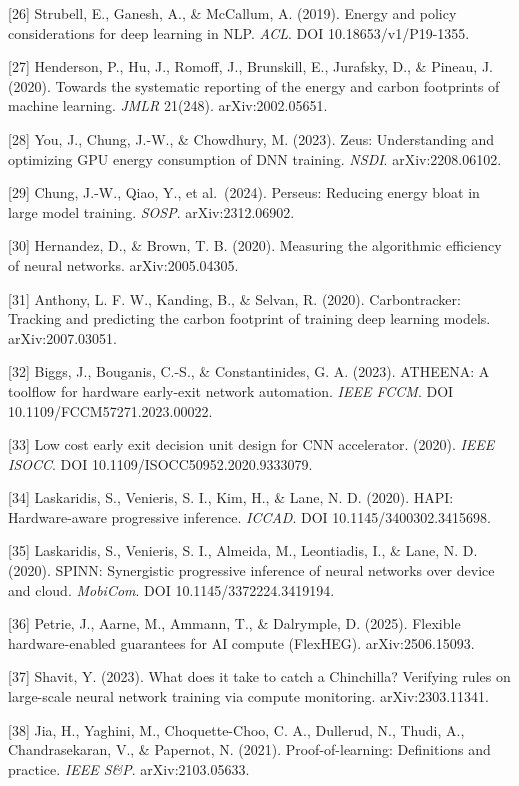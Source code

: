 \documentclass[
]{article}
\begin{document}
{[}26{]} Strubell, E., Ganesh, A., \& McCallum, A. (2019). Energy and
policy considerations for deep learning in NLP. \emph{ACL}. DOI
10.18653/v1/P19-1355.

{[}27{]} Henderson, P., Hu, J., Romoff, J., Brunskill, E., Jurafsky, D.,
\& Pineau, J. (2020). Towards the systematic reporting of the energy and
carbon footprints of machine learning. \emph{JMLR} 21(248).
arXiv:2002.05651.

{[}28{]} You, J., Chung, J.-W., \& Chowdhury, M. (2023). Zeus:
Understanding and optimizing GPU energy consumption of DNN training.
\emph{NSDI}. arXiv:2208.06102.

{[}29{]} Chung, J.-W., Qiao, Y., et al.~(2024). Perseus: Reducing energy
bloat in large model training. \emph{SOSP}. arXiv:2312.06902.

{[}30{]} Hernandez, D., \& Brown, T. B. (2020). Measuring the
algorithmic efficiency of neural networks. arXiv:2005.04305.

{[}31{]} Anthony, L. F. W., Kanding, B., \& Selvan, R. (2020).
Carbontracker: Tracking and predicting the carbon footprint of training
deep learning models. arXiv:2007.03051.

{[}32{]} Biggs, J., Bouganis, C.-S., \& Constantinides, G. A. (2023).
ATHEENA: A toolflow for hardware early-exit network automation.
\emph{IEEE FCCM}. DOI 10.1109/FCCM57271.2023.00022.

{[}33{]} Low cost early exit decision unit design for CNN accelerator.
(2020). \emph{IEEE ISOCC}. DOI 10.1109/ISOCC50952.2020.9333079.

{[}34{]} Laskaridis, S., Venieris, S. I., Kim, H., \& Lane, N. D.
(2020). HAPI: Hardware-aware progressive inference. \emph{ICCAD}. DOI
10.1145/3400302.3415698.

{[}35{]} Laskaridis, S., Venieris, S. I., Almeida, M., Leontiadis, I.,
\& Lane, N. D. (2020). SPINN: Synergistic progressive inference of
neural networks over device and cloud. \emph{MobiCom}. DOI
10.1145/3372224.3419194.

{[}36{]} Petrie, J., Aarne, M., Ammann, T., \& Dalrymple, D. (2025).
Flexible hardware-enabled guarantees for AI compute (FlexHEG).
arXiv:2506.15093.

{[}37{]} Shavit, Y. (2023). What does it take to catch a Chinchilla?
Verifying rules on large-scale neural network training via compute
monitoring. arXiv:2303.11341.

{[}38{]} Jia, H., Yaghini, M., Choquette-Choo, C. A., Dullerud, N.,
Thudi, A., Chandrasekaran, V., \& Papernot, N. (2021).
Proof-of-learning: Definitions and practice. \emph{IEEE S\&P}.
arXiv:2103.05633.
\end{document}
